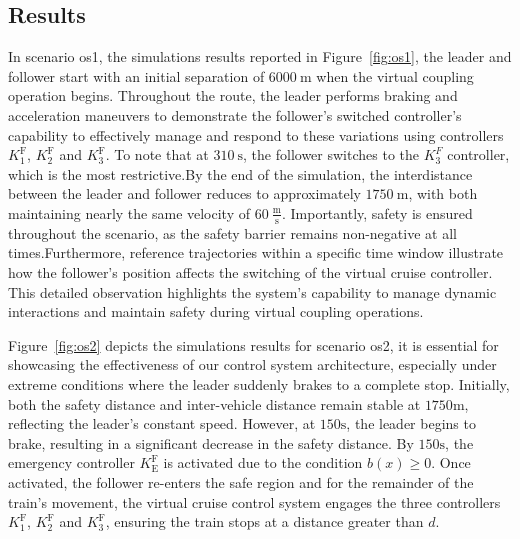\documentclass[letterpaper, 10 pt, conference]{ieeeconf}
\theoremstyle{definition}
\theoremstyle{nopoint}
\newcommand{\tildeAdd}{~}
\begin{document}
		 \subsection{Results}
		\label{sec:results}
		
		In scenario \gls{os}1, the simulations results reported in Figure\tildeAdd\ref{fig:os1}, the leader and follower start with an initial separation of $6000\tildeAdd\unit{\meter}$ when the virtual coupling operation begins. Throughout the route, the leader performs braking and acceleration maneuvers to demonstrate the follower's switched controller's capability to effectively manage and respond to these variations using controllers \( K_1^{\mathrm{F}} \), \( K_2^{\mathrm{F}} \) and \( K_3^{\mathrm{F}} \). To note that at $310\tildeAdd\unit{\second}$, the follower switches to the \( K_3^F \) controller, which is the most restrictive.By the end of the simulation, the interdistance between the leader and follower reduces to approximately $1750\tildeAdd\unit{\meter}$, with both maintaining nearly the same velocity of $60\tildeAdd\frac{\unit{\meter}}{\unit{\second}}$. Importantly, safety is ensured throughout the scenario, as the safety barrier remains non-negative at all times.Furthermore, reference trajectories within a specific time window illustrate how the follower's position affects the switching of the virtual cruise controller. This detailed observation highlights the system's capability to manage dynamic interactions and maintain safety during virtual coupling operations.
		
		Figure\tildeAdd\ref{fig:os2} depicts the simulations results for scenario \gls{os}2, it is essential for showcasing the effectiveness of our control system architecture, especially under extreme conditions where the leader suddenly brakes to a complete stop. Initially, both the safety distance and inter-vehicle distance remain stable at $1750\unit{\meter}$, reflecting the leader's constant speed. However, at $150\unit{\second}$, the leader begins to brake, resulting in a significant decrease in the safety distance. By $150\unit{\second}$, the emergency controller $K_{\mathrm{E}}^{\mathrm{F}}$ is activated due to the condition $b(x) \geq 0$. Once activated, the follower re-enters the safe region and for the remainder of the train's movement, the virtual cruise control system engages the three controllers \( K_1^{\mathrm{F}} \), \( K_2^{\mathrm{F}} \) and \( K_3^{\mathrm{F}} \), ensuring the train stops at a distance greater than $d$.
		
\end{document}
